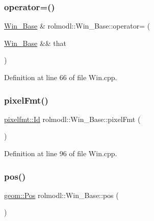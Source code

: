 \mbox{\label{classrolmodl_1_1_win___base_afc3b760d207102432bc4ad001b330f0c}} 
\subsubsection{\texorpdfstring{operator=()}{operator=()}\hspace{0.1cm}{\footnotesize\ttfamily [2/2]}}
{\footnotesize\ttfamily \mbox{\hyperlink{classrolmodl_1_1_win___base}{Win\+\_\+\+Base}} \& rolmodl\+::\+Win\+\_\+\+Base\+::operator= (\begin{DoxyParamCaption}\item[{\mbox{\hyperlink{classrolmodl_1_1_win___base}{Win\+\_\+\+Base}} \&\&}]{that }\end{DoxyParamCaption})\hspace{0.3cm}{\ttfamily [noexcept]}}



Definition at line 66 of file Win.\+cpp.

\mbox{\label{classrolmodl_1_1_win___base_aad46307c1ad78308c4e1befde166682e}} 
\subsubsection{\texorpdfstring{pixelFmt()}{pixelFmt()}}
{\footnotesize\ttfamily \mbox{\hyperlink{namespacerolmodl_1_1pixelfmt_a96282713e4465ba9211c8fd3a702b52b}{pixelfmt\+::\+Id}} rolmodl\+::\+Win\+\_\+\+Base\+::pixel\+Fmt (\begin{DoxyParamCaption}{ }\end{DoxyParamCaption})}



Definition at line 96 of file Win.\+cpp.

\mbox{\label{classrolmodl_1_1_win___base_af0813dd30c002b32f0ab9218059dba55}} 
\subsubsection{\texorpdfstring{pos()}{pos()}}
{\footnotesize\ttfamily \mbox{\hyperlink{structrolmodl_1_1geom_1_1_pos}{geom\+::\+Pos}} rolmodl\+::\+Win\+\_\+\+Base\+::pos (\begin{DoxyParamCaption}{ }\end{DoxyParamCaption})\hspace{0.3cm}{\ttfamily [noexcept]}}



